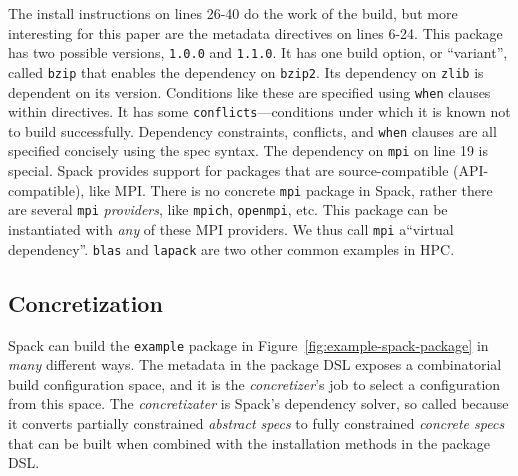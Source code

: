 The install instructions on lines 26-40 do the work of the build, but more interesting
for this paper are the metadata directives on lines 6-24. This package has two possible
versions, {\tt 1.0.0} and {\tt 1.1.0}. It has one build option, or ``variant'', called
{\tt bzip} that enables the dependency on {\tt bzip2}. Its dependency on {\tt zlib} is
dependent on its version. Conditions like these are specified using {\tt when} clauses
within directives. It has some {\tt conflicts}---conditions under which it is known not to build
successfully. Dependency constraints, conflicts, and {\tt when} clauses are all
specified concisely using the  spec syntax.
%
The dependency on {\tt mpi} on line 19 is special. Spack provides support for packages
that are source-compatible (API-compatible), like MPI. There is no concrete {\tt mpi}
package in Spack, rather there are several {\tt mpi} {\it providers}, like {\tt mpich},
{\tt openmpi}, etc. This package can be instantiated with {\it any} of these MPI
providers. We thus call {\tt mpi} a``virtual dependency''. {\tt blas} and {\tt lapack}
are two other common examples in HPC.

\subsection{Concretization}

Spack can build the {\tt example} package in Figure~\ref{fig:example-spack-package} in
{\it many} different ways. The metadata in the package DSL exposes a combinatorial build
configuration space, and it is the {\it concretizer}'s job to select a configuration
from this space. The {\it concretizater} is Spack's dependency solver, so called because
it converts partially constrained \emph{abstract specs} to fully constrained
\emph{concrete specs} that can be built when combined with the installation methods in
the package DSL.

